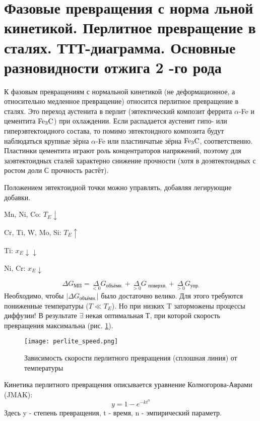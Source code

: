 \section{Фазовые превращения с норма льной кинетикой. Перлитное
превращение в сталях. ТТТ-диаграмма. Основные разновидности отжига 2 -го
рода}
К фазовым превращениям с нормальной кинетикой (не деформационное, а относительно медленное превращение) относится перлитное превращение в сталях. Это переход аустенита в перлит (эвтектический композит феррита $\alpha$-Fe и цементита $\rm Fe_3C$) при охлаждении. Если распадается аустенит гипо- или гиперэвтектоидного состава, то помимо эвтектоидного композита будут наблюдаться крупные зёрна $\alpha$-Fe или пластинчатые зёрна $\rm Fe_3C$, соответственно. Пластинки цементита играют роль концентраторов напряжений, поэтому для заэвтектоидных сталей характерно снижение прочности (хотя в доэвтектоидных с ростом доли С прочность растёт).
\par Положением эвтектоидной точки можно управлять, добавляя легирующие добавки.
\par Mn, Ni, Co: $T_E\downarrow$ 
\par Cr, Ti, W, Mo, Si: $T_E\uparrow$
\par Ti: $x_E\downarrow \downarrow$
\par Ni, Cr: $x_E\downarrow$
\par
\begin{equation}
\Delta G_{\text{МП}} = \underset{<0}\Delta G_{\text{объёмн.}} + \underset{>0}\Delta G_{\text{ поверхн.}} + \underset{>0}\Delta G _{\text{упр.}}
\label{eq:Gibbs_perlite}  
\end{equation}
Необходимо, чтобы $|\Delta G_{\text{объёмн.}}|$ было достаточно велико. Для этого требуются пониженные температуры ($T \ll T_E$). Но при низких T заторможены процессы диффузии! В результате $\exists$ некая оптимальная Т, при которой скорость превращения максимальна (рис. \ref{fig:perlite_speed}).
\begin{figure}[h!]
\centering
\texttt{[image: perlite\_speed.png]}\caption{Зависимость скорости перлитного превращения (сплошная линия) от температуры}\label{fig:perlite_speed}
\end{figure}
\par Кинетика перлитного превращения описывается уравнение Колмогорова-Аврами (JMAK):
\begin{equation}
y=1-e^{-kt^n}
\label{eq:JMAK}  
\end{equation}
Здесь y - степень превращения, t - время, n - эмпирический параметр.
